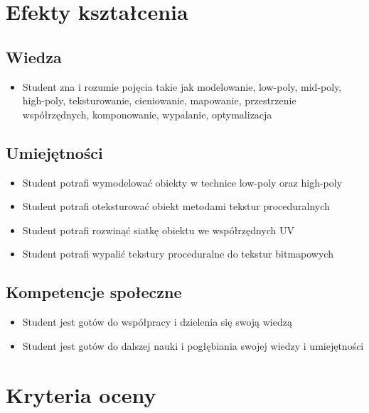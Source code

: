 \documentclass[12pt, a4paper]{article}
\begin{document}
\section{Efekty kształcenia}

\subsection*{Wiedza}
\begin{itemize}
  \item Student zna i rozumie pojęcia takie jak modelowanie, low-poly, mid-poly, high-poly, teksturowanie, cieniowanie, mapowanie, przestrzenie współrzędnych, komponowanie, wypalanie, optymalizacja
\end{itemize}

\subsection*{Umiejętności}
\begin{itemize}
  \item Student potrafi wymodelować obiekty w technice low-poly oraz high-poly
  \item Student potrafi oteksturować obiekt metodami tekstur proceduralnych
  \item Student potrafi rozwinąć siatkę obiektu we współrzędnych UV
  \item Student potrafi wypalić tekstury proceduralne do tekstur bitmapowych
\end{itemize}

\subsection*{Kompetencje społeczne}
\begin{itemize}
  \item Student jest gotów do współpracy i dzielenia się swoją wiedzą
  \item Student jest gotów do dalszej nauki i pogłębiania swojej wiedzy i umiejętności
\end{itemize}

\section{Kryteria oceny}
\end{document}
